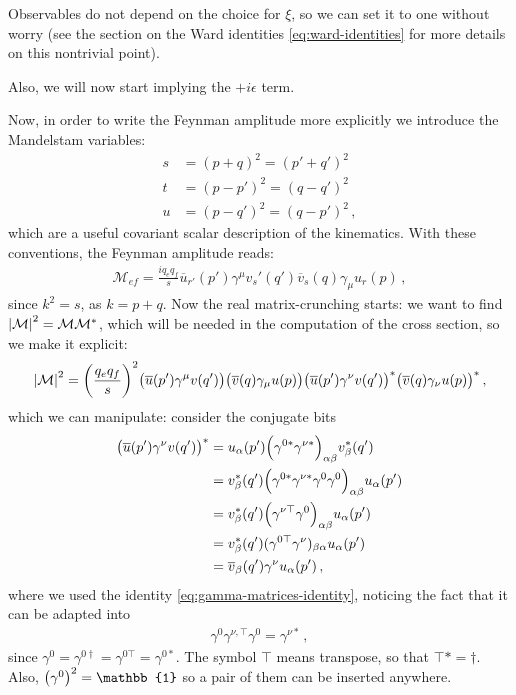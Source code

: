 \documentclass[main.tex]{subfiles}
\begin{document}
Observables do not depend on the choice for \(\xi \), so we can set it to one without worry (see the section on the Ward identities \eqref{eq:ward-identities} for more details on this nontrivial point). 

Also, we will now start implying the \(+i \epsilon \) term.

Now, in order to write the Feynman amplitude more explicitly we introduce the Mandelstam variables: 
%
\begin{align}
s &= (p+q)^2 = (p' + q')^2 \\
t &= (p-p')^2 = (q - q')^2 \\
u &= (p-q')^2 = (q - p')^2 
\,,
\end{align}
%
which are a useful covariant scalar description of the kinematics. 
With these conventions, the Feynman amplitude reads: 
%
\begin{align}
\mathcal{M}_{ef} = \frac{i q_e q_f}{s} 
\overline{u}_{r'} (p') \gamma^{\mu } v_s' (q')
\overline{v}_{s} (q) \gamma_{\mu} u_r (p)
\,,
\end{align}
%
since \(k^2 = s\), as \(k = p+q\).
Now the real matrix-crunching starts: we want to find \(\abs{\mathcal{M}}^2 = \mathcal{M} \mathcal{M}^{*}\), which will be needed in the computation of the cross section, so we make it explicit: 
%
\begin{align}
\abs{\mathcal{M}}^2 = \qty(\frac{q_e q_f}{s})^2 
\qty(\overline{u} (p') \gamma^{\mu } v (q')) \qty(\overline{v}(q) \gamma_{\mu } u(p)) 
\qty(\overline{u} (p') \gamma^{\nu } v (q'))^{*} \qty(\overline{v}(q) \gamma_{\nu } u(p))^{*}
\,,
\end{align}
%
which we can manipulate: consider the conjugate bits
%
\begin{align}
\qty(\overline{u} (p') \gamma^{\nu } v (q'))^{*} 
&= u_{\alpha }(p') \qty( \gamma^{0 *} \gamma^{\nu *})_{\alpha \beta } v^{*}_{\beta } (q')  \\
&= v^{*}_{\beta }(q')\qty( \gamma^{0 *} \gamma^{\nu *} \gamma^{0} \gamma^{0})_{\alpha \beta }
u_\alpha (p')    \\
&= v^{*}_{\beta }(q')\qty( \gamma^{\nu \top} \gamma^{0})_{\alpha \beta }
u_\alpha (p')  \\
&= v^{*}_{\beta } (q') (\gamma^{0 \top} \gamma^{\nu })_{\beta \alpha } u_\alpha (p')  \\
&= \overline{v}_{\beta } (q') \gamma^{\nu  } u_\alpha (p')
\,,
\end{align}
%
where we used the identity \eqref{eq:gamma-matrices-identity}, noticing the fact that it can be adapted into 
%
\begin{align}
\gamma^{0} \gamma^{\nu , \top} \gamma^{0} = \gamma^{\nu *}
\,,
\end{align}
%
since \(\gamma^{0} = \gamma^{0 \dag} = \gamma^{0 \top} = \gamma^{0 *}\). The symbol \(\top\) means transpose, so that \(\top * = \dag\). Also, \(\qty(\gamma^{0})^2 = \mathbb{1}\) so a pair of them can be inserted anywhere.
\end{document}
